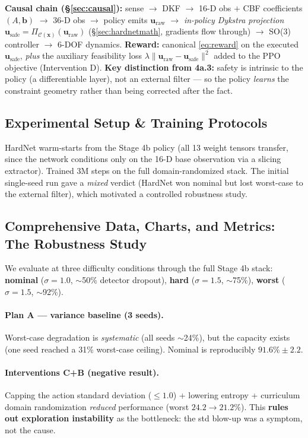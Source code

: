 \documentclass[11pt]{article}
\newcommand{\stagebox}[1]{\vspace{2pt}\noindent\colorbox{boxgray}{%
\parbox{\dimexpr\linewidth-2\fboxsep}{\small #1}}\vspace{4pt}}
\begin{document}
\stagebox{\textbf{Causal chain (\S\ref{sec:causal}):} sense $\rightarrow$ DKF
$\rightarrow$ 16-D obs $+$ CBF coefficients $(A,\mathbf b)$
$\rightarrow$ 36-D obs $\rightarrow$ policy emits $\mathbf u_\text{raw}$
$\rightarrow$ \emph{in-policy Dykstra projection}
$\mathbf u_\text{safe}=\Pi_{\mathcal C(\mathbf x)}(\mathbf u_\text{raw})$
(\S\ref{sec:hardnetmath}, gradients flow through) $\rightarrow$ SO(3)
controller $\rightarrow$ 6-DOF dynamics. \textbf{Reward:} canonical
\eqref{eq:reward} on the executed $\mathbf u_\text{safe}$, \emph{plus} the
auxiliary feasibility loss $\lambda\lVert\mathbf u_\text{raw}-\mathbf u_\text{safe}\rVert^2$
added to the PPO objective (Intervention D). \textbf{Key distinction from
4a.3:} safety is intrinsic to the policy (a differentiable layer), not an
external filter --- so the policy \emph{learns} the constraint geometry rather
than being corrected after the fact.}

\subsection{Experimental Setup \& Training Protocols}
HardNet warm-starts from the Stage 4b policy (all 13 weight tensors transfer,
since the network conditions only on the 16-D base observation via a slicing
extractor). Trained 3M steps on the full domain-randomized stack. The initial
single-seed run gave a \emph{mixed} verdict (HardNet won nominal but lost
worst-case to the external filter), which motivated a controlled robustness
study.

\subsection{Comprehensive Data, Charts, and Metrics: The Robustness Study}
We evaluate at three difficulty conditions through the full Stage 4b stack:
\textbf{nominal} ($\sigma{=}1.0$, $\sim$50\% detector dropout),
\textbf{hard} ($\sigma{=}1.5$, $\sim$75\%), \textbf{worst}
($\sigma{=}1.5$, $\sim$92\%).

\paragraph{Plan A --- variance baseline (3 seeds).} Worst-case degradation is
\emph{systematic} (all seeds $\sim$24\%), but the capacity exists (one seed
reached a 31\% worst-case ceiling). Nominal is reproducibly $91.6\%\pm2.2$.

\paragraph{Interventions C+B (negative result).} Capping the action standard
deviation ($\le1.0$) + lowering entropy + curriculum domain randomization
\emph{reduced} performance (worst $24.2\rightarrow21.2\%$). This
\textbf{rules out exploration instability} as the bottleneck: the std blow-up
was a symptom, not the cause.
\end{document}
